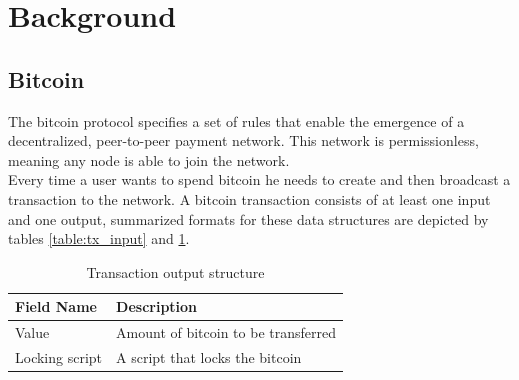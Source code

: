 \section{Background}
\label{sec:background}

\subsection{Bitcoin}
\label{ssection:bitcoin}

The bitcoin protocol \cite{bitcoin-core} specifies a set of rules that enable the emergence of a decentralized, peer-to-peer payment network. This network is permissionless, meaning any node is able to join the network.\\
Every time a user wants to spend bitcoin he needs to create and then broadcast a transaction to the network. A bitcoin transaction consists of at least one input and one output, summarized formats for these data structures are depicted by tables \ref{table:tx_input} and \ref{table:tx_output}.

\begin{table}[H]
\centering
{}
\caption{Transaction input structure}
\label{table:tx_input}
\end{table}

\begin{table}[H]
\centering
\begin{tabular}{|l|l|}
\hline
\rowcolor[HTML]{C0C0C0} 
Field Name & Description \\ \hline
Value & Amount of bitcoin to be transferred \\ \hline
Locking script & A script that locks the bitcoin \\ \hline
\end{tabular}
\caption{Transaction output structure}
\label{table:tx_output}
\end{table}

